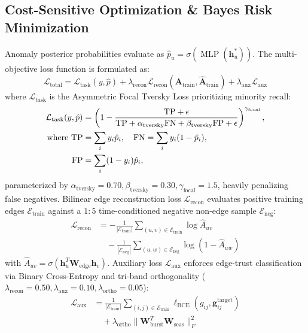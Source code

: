 \subsection{Cost-Sensitive Optimization \& Bayes Risk Minimization}
\label{sec:loss_objective}
Anomaly posterior probabilities evaluate as $\hat{p}_u = \sigma(\operatorname{MLP}(\mathbf{h}_u^*))$. The multi-objective loss function is formulated as:
\begin{equation}
\mathcal{L}_{\text{total}} = \mathcal{L}_{\text{task}}(y, \hat{p}) + \lambda_{\text{recon}} \mathcal{L}_{\text{recon}}(\mathbf{A}_{\text{train}}, \hat{\mathbf{A}}_{\text{train}}) + \lambda_{\text{aux}} \mathcal{L}_{\text{aux}}
\label{eq:total_loss}
\end{equation}
where $\mathcal{L}_{\text{task}}$ is the Asymmetric Focal Tversky Loss prioritizing minority recall:
\begin{align}
\mathcal{L}_{\text{task}}(y, \hat{p}) &= \left( 1 - \frac{\text{TP} + \epsilon}{\text{TP} + \alpha_{\text{tversky}} \text{FN} + \beta_{\text{tversky}} \text{FP} + \epsilon} \right)^{\gamma_{\text{focal}}}, \label{eq:focal_tversky_loss} \\
\text{where } \text{TP} &= \sum_i y_i \hat{p}_i, \quad \text{FN} = \sum_i y_i (1 - \hat{p}_i), \notag \\
\text{FP} &= \sum_i (1 - y_i) \hat{p}_i, \notag
\end{align}
parameterized by $\alpha_{\text{tversky}}=0.70, \beta_{\text{tversky}}=0.30, \gamma_{\text{focal}}=1.5$, heavily penalizing false negatives. Bilinear edge reconstruction loss $\mathcal{L}_{\text{recon}}$ evaluates positive training edges $\mathcal{E}_{\text{train}}$ against a $1:5$ time-conditioned negative non-edge sample $\mathcal{E}_{\text{neg}}$:
\begin{align}
\mathcal{L}_{\text{recon}} &= -\frac{1}{|\mathcal{E}_{\text{train}}|} \sum_{(u, v) \in \mathcal{E}_{\text{train}}} \log \hat{A}_{uv} \nonumber \\
&\quad -\frac{1}{|\mathcal{E}_{\text{neg}}|} \sum_{(u, w) \in \mathcal{E}_{\text{neg}}} \log (1 - \hat{A}_{uw})
\end{align}
with $\hat{A}_{uv} = \sigma(\mathbf{h}_u^T \mathbf{W}_{\text{edge}} \mathbf{h}_v)$. Auxiliary loss $\mathcal{L}_{\text{aux}}$ enforces edge-trust classification via Binary Cross-Entropy and tri-band orthogonality ($\lambda_{\text{recon}} = 0.50, \lambda_{\text{aux}} = 0.10, \lambda_{\text{ortho}} = 0.05$):
\begin{align}
\mathcal{L}_{\text{aux}} &= \frac{1}{|\mathcal{E}_{\text{train}}|} \sum_{(i, j) \in \mathcal{E}_{\text{train}}} \ell_{\text{BCE}}(g_{ij}, \mathbf{g}_{ij}^{\text{target}}) \nonumber \\
&\quad + \lambda_{\text{ortho}} \|\mathbf{W}_{\text{burst}}^T \mathbf{W}_{\text{seas}}\|_F^2
\label{eq:aux_loss}
\end{align}
